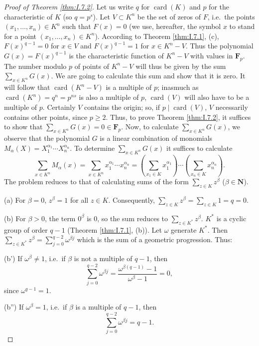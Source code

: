 \begin{proof}[Proof of Theorem \ref{thm:I.7.2}]
Let us write $q$ for $\operatorname{card}(K)$ and $p$ for the characteristic
of $K$ (so $q=p^{s}$). Let $V\subset K^{n}$ be the set of zeros of $F$,
i.e.\ the points $(x_{1},\ldots,x_{n})\in K^{n}$ such that $F(x)=0$ (we use,
hereafter, the symbol $x$ to stand for a point
$(x_{1},\ldots,x_{n})\in K^{n}$). According to Theorem \ref{thm:I.7.1}, (c),
$F(x)^{q-1}=0$ for $x\in V$ and $F(x)^{q-1}=1$ for $x\in K^{n}-V$. Thus the
polynomial $G(x)=F(x)^{q-1}$ is the characteristic function of $K^{n}-V$
with values in $\mathbf{F}_{p}$. The number modulo $p$ of points of
$K^{n}-V$ will thus be given by the sum $\sum_{x\in K^{n}}G(x)$. We are
going to calculate this sum and show that it is zero. It will follow that
$\operatorname{card}(K^{n}-V)$ is a multiple of $p$; inasmuch as
$\operatorname{card}(K^{n})=q^{n}=p^{ns}$ is also a multiple of $p$,
$\operatorname{card}(V)$ will also have to be a multiple of $p$. Certainly
$V$ contains the origin; so, if $p\mid\operatorname{card}(V)$, $V$
necessarily contains other points, since $p\geq2$. Thus, to prove Theorem
\ref{thm:I.7.2}, it suffices to show that
$\sum_{x\in K^{n}}G(x)=0\in\mathbf{F}_{p}$. Now, to calculate
$\sum_{x\in K^{n}}G(x)$, we observe that the polynomial $G$ is a linear
combination of monomials $M_{\alpha}(X)=X_{1}^{\alpha_{1}}\cdots
X_{n}^{\alpha_{n}}$. To determine $\sum_{x\in K^{n}}G(x)$ it suffices to
calculate
\[
\sum_{x\in K^{n}}M_{\alpha}(x)=\sum_{x\in K^{n}}
x_{1}^{\alpha_{1}}\cdots x_{n}^{\alpha_{n}}
=\left(\sum_{x_{1}\in K}x_{1}^{\alpha_{1}}\right)\cdots
\left(\sum_{x_{n}\in K}x_{n}^{\alpha_{n}}\right).
\]
The problem reduces to that of calculating sums of the form
$\sum_{z\in K}z^{\beta}$ ($\beta\in\mathbf{N}$).

(a) For $\beta=0$, $z^{\beta}=1$ for all $z\in K$. Consequently,
$\sum_{z\in K}z^{\beta}=\sum_{z\in K}1=q=0$.

(b) For $\beta>0$, the term $0^{\beta}$ is $0$, so the sum reduces to
$\sum_{z\in K^{*}}z^{\beta}$. $K^{*}$ is a cyclic group of order $q-1$
(Theorem \ref{thm:I.7.1}, (b)). Let $\omega$ generate $K^{*}$. Then
$\sum_{z\in K^{*}}z^{\beta}=\sum_{j=0}^{q-2}\omega^{\beta j}$ which is the
sum of a geometric progression. Thus:

(b') If $\omega^{\beta}\neq1$, i.e.\ if $\beta$ is not a multiple of $q-1$,
then
\[
\sum_{j=0}^{q-2}\omega^{\beta j}
=\frac{\omega^{\beta(q-1)}-1}{\omega^{\beta}-1}=0,
\]
since $\omega^{q-1}=1$.

(b'') If $\omega^{\beta}=1$, i.e.\ if $\beta$ is a multiple of $q-1$, then
\[
\sum_{j=0}^{q-2}\omega^{\beta j}=q-1.
\]


\end{proof}
